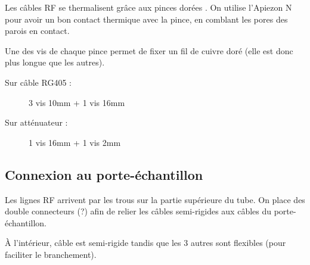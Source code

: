 Les câbles RF se thermalisent grâce aux pinces dorées . On utilise l'Apiezon N pour avoir un bon contact thermique avec la pince, en comblant les pores des parois en contact.

Une des vis de chaque pince permet de fixer un fil de cuivre doré (elle est donc plus longue que les autres).

\begin{description}
    \item[Sur câble RG405 :] 3 vis 10mm + 1 vis 16mm
    \item[Sur atténuateur :] 1 vis 16mm + 1 vis 2mm
\end{description}


\subsection{Connexion au porte-échantillon}

Les lignes RF arrivent par les trous sur la partie supérieure du tube. On place des double connecteurs (?) afin de relier les câbles semi-rigides aux câbles du porte-échantillon.

À l'intérieur, câble est semi-rigide tandis que les 3 autres sont flexibles (pour faciliter le branchement).
